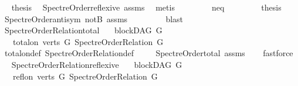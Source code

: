 \begin{isabellebody}
\ \isamarkupfalse%
\ {\isacharquery}{\kern0pt}thesis\ \isamarkupfalse%
\ Spectre{\isacharunderscore}{\kern0pt}Order{\isacharunderscore}{\kern0pt}reflexive\ assms\ \isamarkupfalse%
\ metis\isanewline
\ \ \isamarkupfalse%
\isanewline
\ \ \ \ \isamarkupfalse%
\ neq\isanewline
\ \ \ \ \ \isamarkupfalse%
\ \isamarkupfalse%
\ {\isachardoublequoteopen}{\isacharquery}{\kern0pt}thesis{\isachardoublequoteclose}\ \isamarkupfalse%
\ Spectre{\isacharunderscore}{\kern0pt}Order{\isacharunderscore}{\kern0pt}antisym\ notB\ assms\isanewline
\ \ \ \ \ \ \ \isamarkupfalse%
\ blast\ \isanewline
\ \ \ \isamarkupfalse%
\isanewline
\ \isamarkupfalse%
%
\endisatagproof
{\isafoldproof}%
%
\isadelimproof
\isanewline
%
\endisadelimproof
\isanewline
\isanewline
\isanewline
\isanewline
{}\isamarkupfalse%
\ Spectre{\isacharunderscore}{\kern0pt}Order{\isacharunderscore}{\kern0pt}Relation{\isacharunderscore}{\kern0pt}total{\isacharcolon}{\kern0pt}\isanewline
\ \ \ {\isachardoublequoteopen}blockDAG\ G{\isachardoublequoteclose}\isanewline
\ \ \ {\isachardoublequoteopen}total{\isacharunderscore}{\kern0pt}on\ {\isacharparenleft}{\kern0pt}verts\ G{\isacharparenright}{\kern0pt}\ {\isacharparenleft}{\kern0pt}Spectre{\isacharunderscore}{\kern0pt}Order{\isacharunderscore}{\kern0pt}Relation\ G{\isacharparenright}{\kern0pt}{\isachardoublequoteclose}\isanewline
%
\isadelimproof
\ \ %
\endisadelimproof
%
\isatagproof
{}\isamarkupfalse%
\ total{\isacharunderscore}{\kern0pt}on{\isacharunderscore}{\kern0pt}def\ Spectre{\isacharunderscore}{\kern0pt}Order{\isacharunderscore}{\kern0pt}Relation{\isacharunderscore}{\kern0pt}def\ \isanewline
\ \ \isamarkupfalse%
\ Spectre{\isacharunderscore}{\kern0pt}Order{\isacharunderscore}{\kern0pt}total\ assms\isanewline
\ \ \isamarkupfalse%
\ fastforce%
\endisatagproof
{\isafoldproof}%
%
\isadelimproof
\ \isanewline
%
\endisadelimproof
\isanewline
{}\isamarkupfalse%
\ Spectre{\isacharunderscore}{\kern0pt}Order{\isacharunderscore}{\kern0pt}Relation{\isacharunderscore}{\kern0pt}reflexive{\isacharcolon}{\kern0pt}\isanewline
\ \ \ {\isachardoublequoteopen}blockDAG\ G{\isachardoublequoteclose}\isanewline
\ \ \ {\isachardoublequoteopen}refl{\isacharunderscore}{\kern0pt}on\ {\isacharparenleft}{\kern0pt}verts\ G{\isacharparenright}{\kern0pt}\ {\isacharparenleft}{\kern0pt}Spectre{\isacharunderscore}{\kern0pt}Order{\isacharunderscore}{\kern0pt}Relation\ G{\isacharparenright}{\kern0pt}{\isachardoublequoteclose}\ \isanewline

\end{isabellebody}
